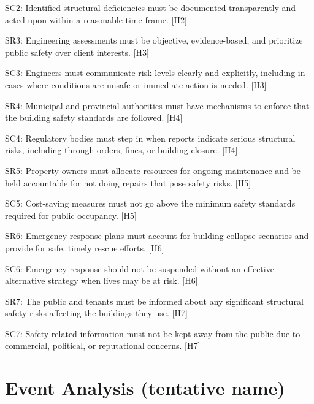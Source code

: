 \documentclass[12pt]{article}
\begin{document}
SC2: Identified structural deficiencies must be documented transparently and acted upon within a reasonable time frame. [H2]

SR3: Engineering assessments must be objective, evidence-based, and prioritize public safety over client interests. [H3]

SC3: Engineers must communicate risk levels clearly and explicitly, including in cases where conditions are unsafe or immediate action is needed. [H3]

SR4: Municipal and provincial authorities must have mechanisms to enforce that the building safety standards are followed. [H4]

SC4: Regulatory bodies must step in when reports indicate serious structural risks, including through orders, fines, or building closure. [H4]

SR5: Property owners must allocate resources for ongoing maintenance and be held accountable for not doing repairs that pose safety risks. [H5]

SC5: Cost-saving measures must not go above the minimum safety standards required for public occupancy. [H5]

SR6: Emergency response plans must account for building collapse scenarios and provide for safe, timely rescue efforts. [H6]

SC6: Emergency response should not be suspended without an effective alternative strategy when lives may be at risk. [H6]

SR7: The public and tenants must be informed about any significant structural safety risks affecting the buildings they use. [H7]

SC7: Safety-related information must not be kept away from the public due to commercial, political, or reputational concerns. [H7]




\section{Event Analysis (tentative name)} %



\end{document}
